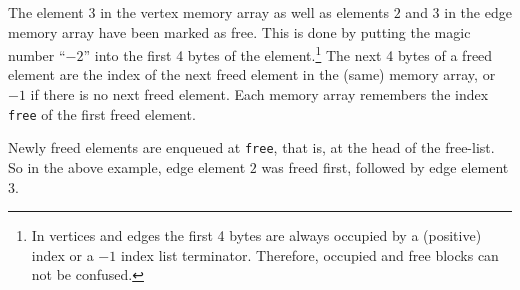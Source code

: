 \begin{center}
\end{center}
The element $3$ in the vertex memory array as well as elements $2$ and $3$ in the edge memory array have been marked as free.
This is done by putting the magic number ``$-2$'' into the first 4 bytes of the element.\footnote{
	In vertices and edges the first 4 bytes are always occupied by a (positive) index or a $-1$ index list terminator.
	Therefore, occupied and free blocks can not be confused.}
The next 4 bytes of a freed element are the index of the next freed element in the (same) memory array,
	or $-1$ if there is no next freed element.
Each memory array remembers the index \texttt{free} of the first freed element.

Newly freed elements are enqueued at \texttt{free}, that is, at the head of the free-list.
So in the above example, edge element $2$ was freed first, followed by edge element $3$.

